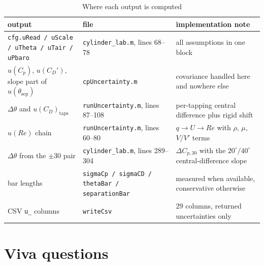 \documentclass[11pt,a4paper]{article}
\newcommand{\Cp}{\ensuremath{C_p}}
\newcommand{\CD}{\ensuremath{C_D}}
\newcommand{\ReD}{\ensuremath{\mathit{Re}}}
\begin{document}
\begin{table}[H]
\centering
\caption{Where each output is computed}
\small
\begin{tabularx}{\textwidth}{@{}p{4.6cm} p{4.2cm} X@{}}
\toprule
output & file & implementation note \\
\midrule
\texttt{cfg.uRead / uScale / uTheta / uTair / uPbaro} & \texttt{cylinder\_lab.m}, lines 68--78 &
all assumptions in one block \\
$u(\Cp)$, $u(\CD')$, slope part of $u(\theta_{\text{sep}})$ & \texttt{cpUncertainty.m} &
covariance handled here and nowhere else \\
$\Delta\theta$ and $u(\CD)_{\text{taps}}$ & \texttt{runUncertainty.m}, lines 87--108 &
per-tapping central difference plus rigid shift \\
$u(\ReD)$ chain & \texttt{runUncertainty.m}, lines 60--80 &
$q \to U \to \ReD$ with $\rho$, $\mu$, $V/V'$ terms \\
$\Delta\theta$ from the $\pm30$ pair & \texttt{cylinder\_lab.m}, lines 289--304 &
$\Delta C_{p,30}$ with the $20^\circ/40^\circ$ central-difference slope \\
bar lengths & \texttt{sigmaCp / sigmaCD / thetaBar / separationBar} &
measured when available, conservative otherwise \\
CSV \texttt{u\_} columns & \texttt{writeCsv} & 29 columns, returned uncertainties only \\
\bottomrule
\end{tabularx}
\end{table}

\section{Viva questions}
\end{document}
